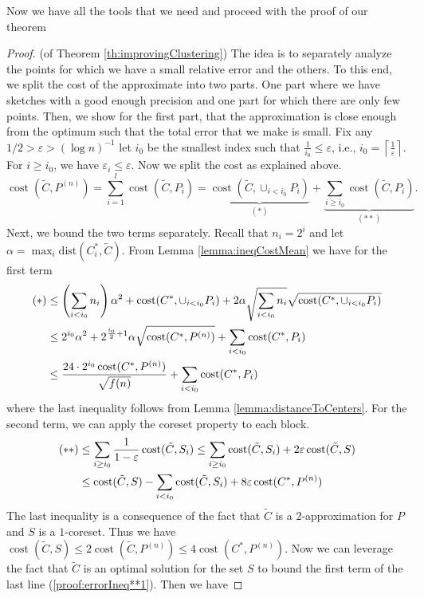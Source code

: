 \documentclass[a4paper,11pt,oneside,english,onecolumn]{article}
\theoremstyle{definition}
\newcommand{\dist}[0]{\ensuremath{\mathrm{dist}}}
\DeclareMathOperator{\cost}{cost}
\newcommand{\ceil}[1]{\left \lceil #1 \right \rceil}
\newcommand{\eps}{\ensuremath{\varepsilon}}
\begin{document}
Now we have all the tools that we need and proceed with the proof of our theorem
\begin{proof}(of Theorem \ref{th:improvingClustering})
The idea is to separately analyze the points for which we have a small relative error and the others. To this end, we split the cost of the approximate into two parts. One part where we have sketches with a good enough precision and one part for which there are only few points. Then, we show for the first part, that the approximation is close enough from the optimum such that the total error that we make is small. Fix any $1/2>\eps>(\log n) ^{-1}$ let $i_0$ be the smallest index such that $\frac{1}{i_0} \leq \eps$, i.e., $i_0 = \ceil{\frac{1}{\eps}}$. For $i \geq i_0$, we have $\eps_i \leq \eps$. Now we split the cost as explained above. $$\cost(\tilde C, P^{(n)}) = \sum_{i = 1}^l \cost(\tilde C, P_i)  = \underbrace{ \cost(\tilde C,\cup_{i < i_0} P_i)}_{(*)} + \underbrace{\sum_{i \geq i_0} \cost(\tilde C, P_i)}_{(**)}.$$
Next, we bound the two terms separately. Recall that $n_i = 2^ i$ and let $\alpha = \max_i \dist(C^*_i, \tilde C)$. From  Lemma \ref{lemma:ineqCostMean} we have for the first term
\begin{align}
(*) & \leq \left(\sum_{i < i_0}  n_i\right) \alpha^2 + \cost(C^*, \cup_{i < i_0}P_i)  + 2 \alpha \sqrt{ \sum_{i < i_0} n_i  } \sqrt{\cost(C^*, \cup_{i < i_0}P_i)}  \notag \\
&\leq 2^{i_0}\alpha^2  + 2^{\frac{i_0} 2 +1}\alpha \sqrt{\cost(C^*, P^{(n)})} + \sum_{i < i_0} \cost(C^*, P_i) \notag \\
&\leq \frac{24\cdot 2^{i_0}\cost(C^*, P^{(n)})}{\sqrt{f(n)}} + \sum_{i < i_0} \cost(C^*, P_i) \label{proof:errorIneq*}
\end{align}
where the last inequality follows from Lemma \ref{lemma:distanceToCenters}. For the second term, we can apply the coreset property to each block.
\begin{align}
(**) & \leq \sum_{i \geq i_0} \frac{1}{1 - \eps} \cost(\tilde C, S_i) \leq \sum_{i \geq i_0} \cost(\tilde C, S_i) + 2\eps \cost(\tilde C, S) \notag\\
	&\leq \cost(\tilde C, S) - \sum_{i < i_0} \cost(\tilde C, S_i) + 8\eps \cost(C^*, P^{(n)}) \label{proof:errorIneq**1}
\end{align}
The last inequality is a consequence of the fact that $\tilde C$ is a $2$-approximation for $P$ and $S$ is a $1$-coreset. Thus we have $\cost(\tilde C, S) \leq 2 \cost(\tilde C, P^{(n)}) \leq 4 \cost(C^*, P^{(n)})$. Now we can leverage the fact that $\tilde C$ is an optimal solution for the set $S$ to bound the first term of the last line (\ref{proof:errorIneq**1}). Then we have

\end{proof}
\end{document}
